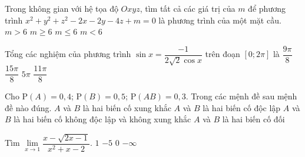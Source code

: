 \begin{ex}%
	Trong không gian với hệ tọa độ $Oxyz$, tìm tất cả các giá trị của $m$ để phương trình $x^2+y^2+z^2-2x-2y-4z+m=0$ là phương trình của một mặt cầu.
	\choice
	{$m>6$}
	{$m\geq 6$}
	{$m\leq 6$}
	{\True $m<6$} 
\end{ex}

\begin{ex}%
	Tổng các nghiệm của phương trình $\sin x=\dfrac{-1}{2\sqrt{2}\cos x}$ trên đoạn $\left[0;2\pi\right]$  là
	\choice
	{$\dfrac{9\pi}{8}$}
	{$\dfrac{15\pi}{8}$}
	{\True $5\pi$}
	{$\dfrac{11\pi}{8}$}
\end{ex}

\begin{ex}%
	Cho $\mathrm{P}(A)=0{,}4$; $\mathrm{P}(B)=0{,}5$; $\mathrm{P}(AB)=0{,}3$. Trong các mệnh đề sau mệnh đề nào đúng.
	\choice
	{$A$ và $B$ là hai biến cố xung khắc}
	{$A$ và $B$ là hai biến cố độc lập}
	{\True  $A$ và $B$ là hai biến cố không độc lập và không xung khắc}
	{$A$ và $B$ là hai biến cố đối}
\end{ex}

\begin{ex}%
	Tìm  $\lim\limits_{x\to 1}\dfrac{x-\sqrt{2x-1}}{x^2+x-2}$.
	\choice
	{$1$}
	{$-5$}
	{\True $0$}
	{$-\infty$}
\end{ex}

